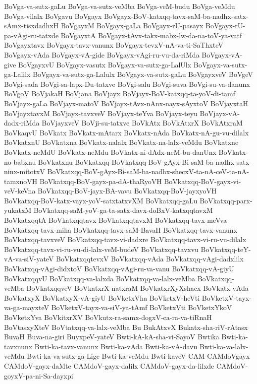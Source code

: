 {BoVga-va-sutx-gaLu
BoVga-va-sutx-veMba
BoVga-veM-budu
BoVga-veMdu
BoVga-vilalx
BoVgavu
BoVgayx
BoVgayx-BoV-katxqq-tavx-saM-ba-nadhx-satx-sAmx-tisxdadhxH
BoVgayxM
BoVgayx-gaLa
BoVgayx-rU-pasayx
BoVgayx-rU-pa-vAgi-ru-tatxde
BoVgayxtA
BoVgayx-tAvx-takx-mabx-lw-da-na-toV-ya-vatf
BoVgayxtavx
BoVgayx-tavx-vanunx
BoVgayx-tevxV-nA-va-ti-SaThxteV
BoVgayx-vAda
BoVgayx-vA-gide
BoVgayx-vAgi-ru-vu-da-riMda
BoVgayx-vA-give
BoVgayxvU
BoVgayx-vasutx
BoVgayx-va-sutx-ga-LalUlx
BoVgayx-va-sutx-ga-Lalilx
BoVgayx-va-sutx-ga-Lalulx
BoVgayx-va-sutx-gaLu
BoVgayxveV
BoVgeV
BoVgi-sada
BoVgi-sa-lapx-Du-tatxve
BoVgi-salu
BoVgi-suva
BoVgi-su-va-danunx
BoVgoV
BoVjakaH
BoVjana
BoVjayx
BoVjayx-BoV-katxqq-ta-yoV-di-tamf
BoVjayx-gaLa
BoVjayx-matoV
BoVjayx-tAvx-nAnx-nayx-sAyxtoV
BoVjayxtaH
BoVjayxtavxM
BoVjayx-tavxveV
BoVjayx-teYva
BoVjayx-teyu
BoVjayx-vA-dadx-riMda
BoVjayxveV
BoVji-su-tatxve
BoVkAtx
BoVkAtxrX
BoVkAtxraM
BoVkaqvU
BoVkatx
BoVkatx-mAtarx
BoVkatx-nAda
BoVkatx-nA-gu-vu-dilalx
BoVkatxnU
BoVkatxna
BoVkatx-nalalx
BoVkatx-na-lalx-veMdu
BoVkatxne
BoVkatx-neMdU
BoVkatx-neMdu
BoVkatx-ni-dAdx-neM-bu-danUnx
BoVkatx-no-babxnu
BoVkatxnu
BoVkatxqq
BoVkatxqq-BoV-gAyx-Bi-saM-ba-nadhx-satx-ninx-mitotxV
BoVkatxqq-BoV-gAyx-Bi-saM-ba-nadhx-shecxV-ta-nA-ceV-ta-nA-tamxnoVH
BoVkatxqq-BoV-gayx-pa-dA-thaRyoVH
BoVkatxqq-BoV-gayx-vi-veV-keVna
BoVkatxqq-BoV-jayx-BA-vavu
BoVkatxqq-BoV-jayxyoVH
BoVkatxqq-BoV-katx-vayx-yoV-satxtatxvXM
BoVkatxqq-gaLu
BoVkatxqq-parx-yukatxM
BoVkatxqq-saM-yoV-ga-ta-satx-davx-doBxV-katxqqtavxM
BoVkatxqqtA
BoVkatxqqtavx
BoVkatxqqtavxM
BoVkatxqq-tavx-meVva
BoVkatxqq-tavx-miha
BoVkatxqq-tavx-saM-BavaH
BoVkatxqq-tavx-vanunx
BoVkatxqq-tavxveV
BoVkatxqq-tavx-vi-dadxre
BoVkatxqq-tavx-vi-ru-vu-dilalx
BoVkatxqq-tavx-vi-ru-vu-di-lalx-veM-budeV
BoVkatxqq-tavxvu
BoVkatxqq-teY-vA-va-siV-yateV
BoVkatxqqtevxV
BoVkatxqq-vAda
BoVkatxqq-vAgi-dadxlilx
BoVkatxqq-vAgi-didxtoV
BoVkatxqq-vAgi-ru-va-vanu
BoVkatxqq-vA-giyU
BoVkatxqqvU
BoVkatxqq-va-lalxda
BoVkatxqq-va-lalx-veMba
BoVkatxqq-veMba
BoVkatxqqveV
BoVkatxrX-natxraM
BoVkatxrXyXshacx
BoVkatx-vAda
BoVkatxyX
BoVkatxyX-vA-giyU
BoVketxVha
BoVketxV-heVti
BoVketxV-tayx-va-ga-mayxteV
BoVketxV-tayx-va-siV-ya-tAmf
BoVketxVti
BoVketxYkoV
BoVketxYva
BoVkitxrXV
BoVkutx-ra-samx-dogxV-ca-ra-va-tiRnaH
BoVtasxyXteV
BoVtatxqq-va-lalx-veMba
Bu
BukAtxvX
Bukatx-sha-riV-rAtasx
BuvaH
Buva-na-giri
BuyxpeV-yateV
Bwti-kA-kA-sha-vi-SayoV
Bwtika
Bwti-ka-tavxnunx
Bwti-ka-tavx-vanunx
Bwti-ka-vAda
Bwti-ka-vA-davu
Bwti-ka-va-lalx-veMdu
Bwti-ka-va-sutx-ga-Lige
Bwti-ka-veMdu
Bwti-kaveV
CAM
CAMdoVgayx
CAMdoV-gayx-daMte
CAMdoV-gayx-dalilx
CAMdoV-gayx-da-lilxde
CAMdoV-goyxV-pa-ni-Sa-dayxpi
}
